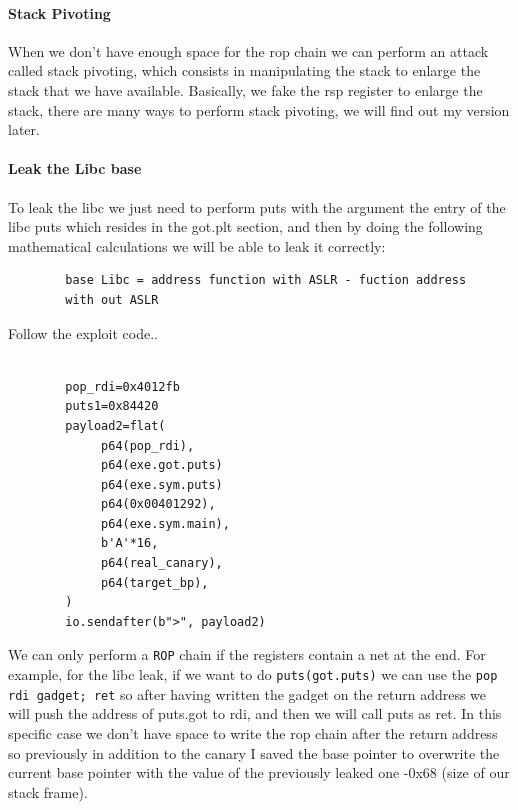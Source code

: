     \paragraph{Stack Pivoting}

    When we don't have enough space for the rop chain we can perform an attack called stack pivoting, which consists in manipulating the stack to enlarge the stack that we have available. \newline
    Basically, we fake the rsp register to enlarge the stack, there are many ways to perform stack pivoting, we will find out my version later.\newline
    \paragraph{Leak the Libc base}
    To leak the libc we just need to perform puts with the argument the entry of the libc puts which resides in the got.plt section, and then by doing the following mathematical calculations we will be able to leak it correctly:\newline
    \begin{verbatim}
        base Libc = address function with ASLR - fuction address
        with out ASLR  
    \end{verbatim}
    Follow the exploit code.\newline.
    \begin{verbatim}
                
        pop_rdi=0x4012fb
        puts1=0x84420      
        payload2=flat(
             p64(pop_rdi),
             p64(exe.got.puts)
             p64(exe.sym.puts)
             p64(0x00401292), 
             p64(exe.sym.main),
             b'A'*16,
             p64(real_canary), 
             p64(target_bp), 
        )
        io.sendafter(b">", payload2)
    \end{verbatim}
     We can only perform a \texttt{ROP} chain if the registers contain a net at the end.\newline
    For example, for the libc leak, if we want to do \texttt{puts(got.puts)} we can use the \texttt{pop rdi gadget; ret} so after having written the gadget on the return address we will push the address of puts.got to rdi, and then we will call puts as ret.\newline   
    In this specific case we don't have space to write the rop chain after the return address so previously in addition to the canary I saved the base pointer to overwrite the current base pointer with the value of the previously leaked one -0x68 (size of our stack frame).\newline
